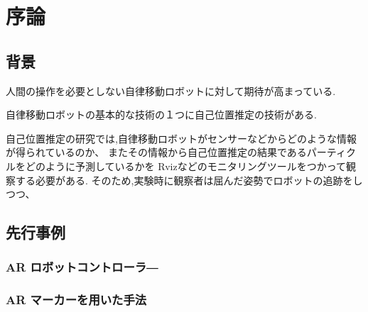 \chapter{序論}

\section{背景}
人間の操作を必要としない自律移動ロボットに対して期待が高まっている.

自律移動ロボットの基本的な技術の１つに自己位置推定の技術がある.

自己位置推定の研究では,自律移動ロボットがセンサーなどからどのような情報が得られているのか、
またその情報から自己位置推定の結果であるパーティクルをどのように予測しているかを
Rvizなどのモニタリングツールをつかって観察する必要がある.
そのため,実験時に観察者は屈んだ姿勢でロボットの追跡をしつつ、



\section{先行事例}

\subsection{AR ロボットコントローラ―}

\cite{鈴木勇矢2019ARロボットコントローラー}

\subsection{AR マーカーを用いた手法}

%
